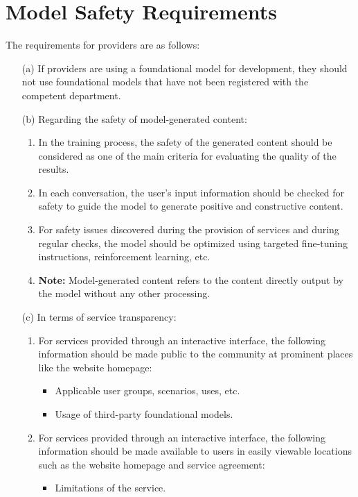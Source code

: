 \documentclass{article}
\begin{document}
\section{Model Safety Requirements}
The requirements for providers are as follows:
\begin{itemize}
    \item[(a)] If providers are using a foundational model for development, they should not use foundational models that have not been registered with the competent department.
    \item[(b)] Regarding the safety of model-generated content:
    \begin{enumerate}
        \item In the training process, the safety of the generated content should be considered as one of the main criteria for evaluating the quality of the results.
        \item In each conversation, the user's input information should be checked for safety to guide the model to generate positive and constructive content.
        \item For safety issues discovered during the provision of services and during regular checks, the model should be optimized using targeted fine-tuning instructions, reinforcement learning, etc.
        \item \textbf{Note:} Model-generated content refers to the content directly output by the model without any other processing.
    \end{enumerate}
    \item[(c)] In terms of service transparency:
    \begin{enumerate}
        \item For services provided through an interactive interface, the following information should be made public to the community at prominent places like the website homepage:
        \begin{itemize}
            \item Applicable user groups, scenarios, uses, etc.
            \item Usage of third-party foundational models.
        \end{itemize}
        \item For services provided through an interactive interface, the following information should be made available to users in easily viewable locations such as the website homepage and service agreement:
        \begin{itemize}
            \item Limitations of the service.

\end{itemize}
\end{enumerate}
\end{itemize}
\end{document}
